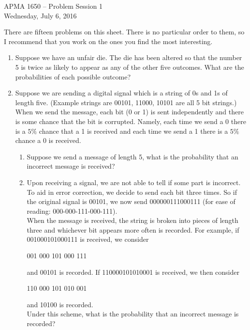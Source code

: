 \documentclass[12pt]{article}
\begin{document}
\title{}
\author{\vspace{-10ex} }

\begin{center}
{\LARGE APMA 1650 -- Problem Session 1}\\
\vspace{5mm}
{\large Wednesday, July 6, 2016}\\
\end{center}

There are fifteen problems on this sheet. There is no particular order to them, so I recommend that you work on the ones you find the most interesting.

\begin{enumerate}

\item Suppose we have an unfair die. The die has been altered so that the number 5 is twice as likely to appear as any of the other five outcomes. What are the probabilities of each possible outcome?

\item Suppose we are sending a digital signal which is a string of 0s and 1s of length five. (Example strings are 00101, 11000, 10101 are all 5 bit strings.) When we send the message, each bit (0 or 1) is sent independently and there is some chance that the bit is corrupted. Namely, each time we send a 0 there is a $5\%$ chance that a 1 is received and each time we send a 1 there is a $5\%$ chance a 0 is received.\\
\begin{enumerate}
\item Suppose we send a message of length 5, what is the probability that an incorrect message is received?
\item Upon receiving a signal, we are not able to tell if some part is incorrect. To aid in error correction, we decide to send each bit three times. So if the original signal is 00101, we now send 000000111000111 (for ease of reading: 000-000-111-000-111).\\
\linebreak
When the message is received, the string is broken into pieces of length three and whichever bit appears more often is recorded. For example, if 001000101000111 is received, we consider\\
\begin{center}
001 000 101 000 111\\
\end{center}
and 00101 is recorded. If 110000101010001 is received, we then consider
\begin{center}
110 000 101 010 001\\
\end{center}
and 10100 is recorded.\\
\linebreak
Under this scheme, what is the probability that an incorrect message is recorded?
\end{enumerate}


\end{enumerate}
\end{document}

